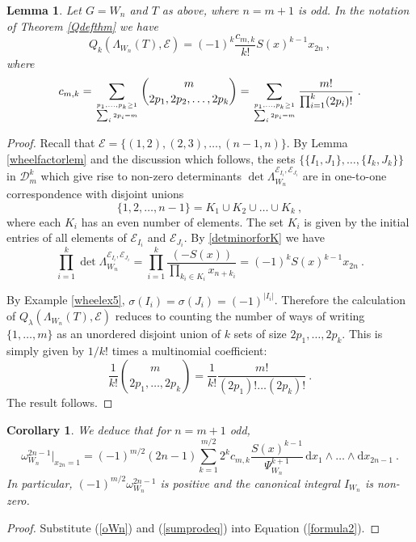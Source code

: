 \documentclass[10pt]{amsart}
\newcommand{\dd}{\mathrm{d}}
\newcommand{\sE}{\mathcal{E}}
\theoremstyle{plain}
\newtheorem{lem}[thm]{Lemma}
\newtheorem{cor}[thm]{Corollary}
\newcommand{\0}{\color{blue}{\mathsf{0}}}
\begin{document}
\begin{lem}
Let $G=W_n$ and $T$ as above, where $n=m+1$ is odd. In the notation of Theorem \ref{Qdefthm} we have
\begin{equation}\label{sumprodeq}
Q_k(\Lambda_{W_n}(T),\sE)=(-1)^k \frac{c_{m,k}}{k!} S(x)^{k-1}x_{2n}\ ,
\end{equation} 
where
\begin{equation}\label{sumprodeq2}
c_{m,k}=\sum_{\genfrac{}{}{0pt}{}{p_1,\ldots,p_k \geq1}{\sum_i 2p_i=m}} \binom{m}{2p_1, 2p_2,\ldots, 2p_k}=\sum_{\genfrac{}{}{0pt}{}{p_1,\ldots,p_k \geq1}{\sum_i 2p_i=m}}\frac{ m!}{\prod_{i=1}^k (2p_i)!} \ . 
\end{equation}
\end{lem}

\begin{proof} Recall that $\sE= \{(1,2), (2,3), \ldots, (n-1,n)\}.$
By Lemma \ref{wheelfactorlem} and the discussion which follows, the sets $\{\{I_1,J_1\}, \ldots, \{I_k, J_k\}\}$ in $\mathcal{D}^k_{m}$ which 
give rise to non-zero determinants  $\det \Lambda_{W_n}^{\sE_{I_i}, \sE_{J_i}}$
are in one-to-one correspondence with disjoint unions
\begin{equation} \label{inproofKunion} \{1,2,\ldots, n-1\} = K_1 \cup K_2 \cup \ldots \cup K_{k}\ ,\end{equation}
where each $K_i$ has an even number of elements. The set $K_i$ is given by the initial entries of all elements of  $\sE_{I_i}$ and $\sE_{J_i}$.  By \eqref{detminorforK} we have 
\[ \prod_{i=1}^k \det \Lambda_{W_n}^{\sE_{I_i}, \sE_{J_i}}    =  \prod_{i=1}^k \frac{(-S(x))}{\prod_{k_i\in K_i}x_{n+k_i}}=(-1)^k S(x)^{k-1}x_{2n}\ .\] 

By Example \ref{wheelex5},  $\sigma(I_i)=\sigma(J_i)=(-1)^{|I_i|}$.  Therefore the  calculation of
$Q_\lambda(\Lambda_{W_n}(T),\sE)$ reduces to counting the
number of ways of writing $\{1,\ldots, m\}$ as an unordered  disjoint union of $k$ sets of size $2p_1,\ldots, 2p_k$. This is simply given by $1/k!$ times a  multinomial coefficient:
\[   \frac{1}{k!}  \binom{m}{2p_1,\ldots, 2p_k} =  \frac{1}{k!} \frac{m!}{(2p_1)! \ldots (2p_k)!} \ .\]
The result follows.
\end{proof}

\begin{cor} \label{cor: Wheelintegrandintermsofccoeffs}
We deduce that  for $n=m+1$ odd, 
\[ \omega_{W_n}^{2n-1}\big|_{x_{2n}=1} = (-1)^{m/2}(2n-1) \sum_{k=1}^{m/2}2^kc_{m,k}\frac{S(x)^{k-1}}{\Psi^{k+1}_{W_n}} \, \dd x_1\wedge \ldots \wedge \dd x_{2n-1}\ . \]
In particular, $(-1)^{m/2}\omega_{W_n}^{2n-1}$ is positive and  the canonical integral $I_{W_n}$ is non-zero.
\end{cor}
\begin{proof}
Substitute (\ref{oWn}) and (\ref{sumprodeq}) into Equation (\ref{formula2}). 
\end{proof}
\end{document}
